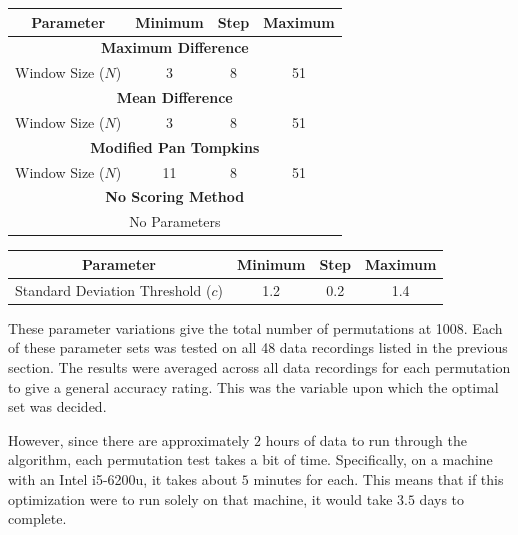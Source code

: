         \begin{center}
            \label{tbl_scoring}
            \begin{tabular}{|c|c|c|c|}
                \hline
                Parameter & Minimum & Step & Maximum \\
                \hline
                \multicolumn{4}{|c|}{\textbf{Maximum Difference}} \\
                \hline
                Window Size ($N$) & 3 & 8 & 51 \\
                \hline
                \multicolumn{4}{|c|}{\textbf{Mean Difference}} \\
                \hline
                Window Size ($N$) & 3 & 8 & 51 \\
                \hline
                \multicolumn{4}{|c|}{\textbf{Modified Pan Tompkins}} \\
                \hline
                Window Size ($N$) & 11 & 8 & 51 \\
                \hline
                \multicolumn{4}{|c|}{\textbf{No Scoring Method}} \\
                \hline
                \multicolumn{4}{|c|}{No Parameters} \\
                \hline
            \end{tabular}
        \end{center}
        \begin{center}
            \label{tbl_detection}
            \begin{tabular}{|c|c|c|c|}
                \hline
                Parameter & Minimum & Step & Maximum \\
                \hline
                Standard Deviation Threshold ($c$) & 1.2 & 0.2 & 1.4 \\
                \hline
            \end{tabular}
        \end{center}

        These parameter variations give the total number of permutations at 1008. Each of these parameter sets was tested on all 48 data recordings listed in the previous section. The results were averaged across all data recordings for each permutation to give a general accuracy rating. This was the variable upon which the optimal set was decided. 

        However, since there are approximately $2$ hours of data to run through the algorithm, each permutation test takes a bit of time. Specifically, on a machine with an Intel i5-6200u, it takes about $5$ minutes for each. This means that if this optimization were to run solely on that machine, it would take $3.5$ days to complete.

